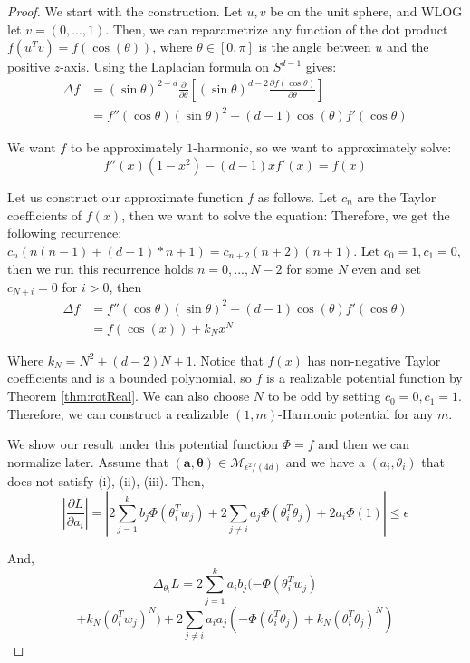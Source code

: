 \documentclass{article}
\newcommand{\pd}[2]{\frac{\partial#1}{\partial#2}}
\begin{document}
\begin{proof}
We start with the construction. Let $u,v$ be on the unit sphere, and WLOG let $v = (0,...,1)$. Then, we can reparametrize any function of the dot product $f(u^Tv) = f(\cos(\theta))$, where $\theta \in [0, \pi]$ is the angle between $u$ and the positive $z$-axis.
Using the Laplacian formula on $S^{d-1}$ gives:
\begin{align*}
\Delta f & = (\sin \theta)^{2-d} \frac{\partial}{\partial \theta}\left[ (\sin \theta)^{d-2} \frac{\partial f(\cos \theta)}{\partial \theta}\right] \\
& = f''(\cos\theta)(\sin \theta)^{2} - (d-1)\cos(\theta)f'(\cos\theta)
\end{align*}

We want $f$ to be approximately $1$-harmonic, so we want to approximately solve:
%
\[f''(x)(1-x^2) - (d-1)xf'(x) =  f(x) \]

Let us construct our approximate function $f$ as follows. Let $c_n$ are the Taylor coefficients of $f(x)$, then we want to solve the equation:
Therefore, we get the following recurrence: $c_n (n(n-1) + (d-1)*n + 1) = c_{n+2} (n+2)(n+1)$. Let $c_0 = 1, c_1 = 0$, then we run this recurrence holds $n=0,...,N-2$ for some $N$ even and set $c_{N+i} = 0$ for $i > 0$, then
\begin{align*}
\Delta f & = f''(\cos\theta)(\sin \theta)^{2} - (d-1)\cos(\theta)f'(\cos\theta) \\
&= f(\cos(x)) + k_Nx^N
\end{align*}

Where $k_N = N^2 + (d-2)N + 1$. Notice that $f(x)$ has non-negative Taylor coefficients and is a bounded polynomial, so $f$ is a realizable potential function by Theorem \ref{thm:rotReal}. We can also choose $N$ to be odd by setting $c_0 = 0, c_1 = 1$. Therefore, we can construct a realizable $(1, m)$-Harmonic potential for any $m$.

We show our result under this potential function $\Phi = f$ and then we can normalize later. Assume that $(\boldsymbol{a,\theta}) \in \mathcal{M}_{\epsilon^2/(4d)}$ and we have a $(a_i,\theta_i)$ that does not satisfy (i), (ii), (iii). Then,
%
\[|\pd{L}{a_i}| = |2\sum_{j=1}^k  b_j  \Phi(\theta_i^T w_j) +  2\sum_{j\neq i} a_j \Phi(\theta_i^T\theta_j)  + 2a_i\Phi(1)| \leq \epsilon \] 

And, 
%
\[\Delta_{\theta_i} L =  2\sum_{j=1}^k a_i b_j  (-\Phi(\theta_i^T w_j) \]
\[+ k_N(\theta_i^Tw_j)^N) +  2\sum_{j\neq i} a_i a_j(-\Phi(\theta_i^T\theta_j) + k_N(\theta_i^T\theta_j)^N)\]


\end{proof}
\end{document}
